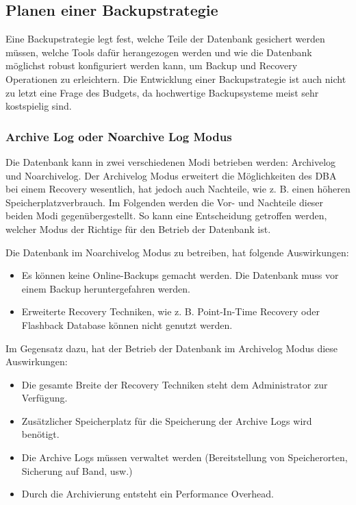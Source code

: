       \subsection{Planen einer Backupstrategie}
        Eine Backupstrategie legt fest, welche Teile der Datenbank gesichert werden m\"ussen, welche Tools daf\"ur herangezogen werden und wie die Datenbank m\"oglichst robust konfiguriert werden kann, um Backup und Recovery Operationen zu erleichtern. Die Entwicklung einer Backupstrategie ist auch nicht zu letzt eine Frage des Budgets, da hochwertige Backupsysteme meist sehr kostspielig sind.
        \subsubsection{Archive Log oder Noarchive Log Modus}
          Die Datenbank kann in zwei verschiedenen Modi betrieben werden: Archivelog und Noarchivelog. Der Archivelog Modus erweitert die M\"oglichkeiten des DBA bei einem Recovery wesentlich, hat jedoch auch Nachteile, wie z. B. einen h\"oheren Speicherplatzverbrauch. Im Folgenden werden die Vor- und Nachteile dieser beiden Modi gegen\"ubergestellt. So kann eine Entscheidung getroffen werden, welcher Modus der Richtige f\"ur den Betrieb der Datenbank ist.

          Die Datenbank im Noarchivelog Modus zu betreiben, hat folgende Auswirkungen:
          \begin{itemize}
            \item Es k\"onnen keine Online-Backups gemacht werden. Die Datenbank muss vor einem Backup heruntergefahren werden.
            \item Erweiterte Recovery Techniken, wie z. B. Point-In-Time Recovery oder Flashback Database k\"onnen nicht genutzt werden.
          \end{itemize}
          Im Gegensatz dazu, hat der Betrieb der Datenbank im Archivelog Modus diese Auswirkungen:
          \begin{itemize}
            \item Die gesamte Breite der Recovery Techniken steht dem Administrator zur Verf\"ugung.
            \item Zus\"atzlicher Speicherplatz f\"ur die Speicherung der Archive Logs wird ben\"otigt.
            \item Die Archive Logs m\"ussen verwaltet werden (Bereitstellung von Speicherorten, Sicherung auf Band, usw.)
            \item Durch die Archivierung entsteht ein Performance Overhead.
          \end{itemize}
